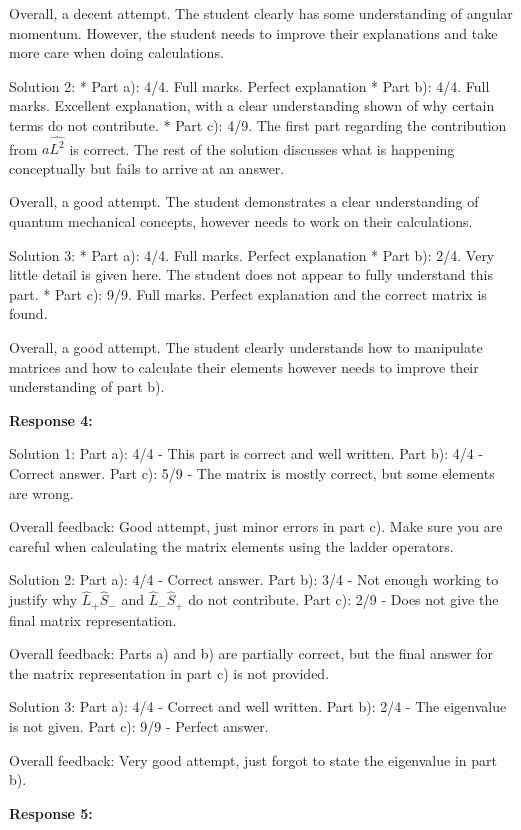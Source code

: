 \documentclass[a4paper,11pt]{article}
\begin{document}
Overall, a decent attempt. The student clearly has some understanding of angular momentum. However, the student needs to improve their explanations and take more care when doing calculations. 

Solution 2: 
* Part a): 4/4. Full marks. Perfect explanation
* Part b): 4/4. Full marks. Excellent explanation, with a clear understanding shown of why certain terms do not contribute. 
* Part c): 4/9. The first part regarding the contribution from \( a\hat{L^{2}} \) is correct. The rest of the solution discusses what is happening conceptually but fails to arrive at an answer. 

Overall, a good attempt. The student demonstrates a clear understanding of quantum mechanical concepts, however needs to work on their calculations. 

Solution 3: 
* Part a): 4/4. Full marks. Perfect explanation
* Part b): 2/4. Very little detail is given here. The student does not appear to fully understand this part. 
* Part c): 9/9. Full marks. Perfect explanation and the correct matrix is found. 

Overall, a good attempt. The student clearly understands how to manipulate matrices and how to calculate their elements however needs to improve their understanding of part b). 

\bigskip    
\textbf{Response 4:}

Solution 1:
Part a): 4/4 - This part is correct and well written.
Part b): 4/4 - Correct answer. 
Part c): 5/9 - The matrix is mostly correct, but some elements are wrong. 

Overall feedback: Good attempt, just minor errors in part c). Make sure you are careful when calculating the matrix elements using the ladder operators. 

Solution 2:
Part a): 4/4 - Correct answer. 
Part b): 3/4 - Not enough working to justify why \( \hat{L}_{+}\hat{S}_{-} \) and \( \hat{L}_{-}\hat{S}_{+} \) do not contribute. 
Part c): 2/9 - Does not give the final matrix representation.

Overall feedback: Parts a) and b) are partially correct, but the final answer for the matrix representation in part c) is not provided. 

Solution 3:
Part a): 4/4 - Correct and well written. 
Part b): 2/4 - The eigenvalue is not given.
Part c): 9/9 - Perfect answer. 

Overall feedback: Very good attempt, just forgot to state the eigenvalue in part b). 

\bigskip    
\textbf{Response 5:}
\end{document}
